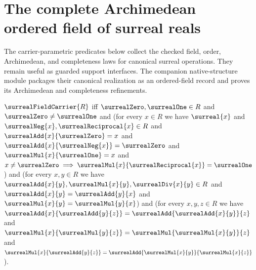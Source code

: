 

\section{The complete Archimedean ordered field of surreal reals}

The carrier-parametric predicates below collect the checked field, order,
Archimedean, and completeness laws for canonical surreal operations. They
remain useful as guarded support interfaces. The companion native-structure
module packages their canonical realization as an ordered-field record and
proves its Archimedean and completeness refinements.

\begin{definition}\label{surreal_field_carrier}
    $\surrealFieldCarrier{R}$ iff
        $\surrealZero,\surrealOne\in R$ and
        $\surrealZero\neq\surrealOne$ and
        (for every $x\in R$ we have
            $\surreal{x}$ and
            $\surrealNeg{x},\surrealReciprocal{x}\in R$ and
            $\surrealAdd{x}{\surrealZero}=x$ and
            $\surrealAdd{x}{\surrealNeg{x}}=\surrealZero$ and
            $\surrealMul{x}{\surrealOne}=x$ and
            $x\neq\surrealZero\implies
                \surrealMul{x}{\surrealReciprocal{x}}=\surrealOne$) and
        (for every $x,y\in R$ we have
            $\surrealAdd{x}{y},\surrealMul{x}{y},\surrealDiv{x}{y}\in R$ and
            $\surrealAdd{x}{y}=\surrealAdd{y}{x}$ and
            $\surrealMul{x}{y}=\surrealMul{y}{x}$) and
        (for every $x,y,z\in R$ we have
            $\surrealAdd{x}{\surrealAdd{y}{z}}
                =\surrealAdd{\surrealAdd{x}{y}}{z}$ and
            $\surrealMul{x}{\surrealMul{y}{z}}
                =\surrealMul{\surrealMul{x}{y}}{z}$ and
            $\surrealMul{x}{\surrealAdd{y}{z}}
                =\surrealAdd{\surrealMul{x}{y}}{\surrealMul{x}{z}}$).
\end{definition}

